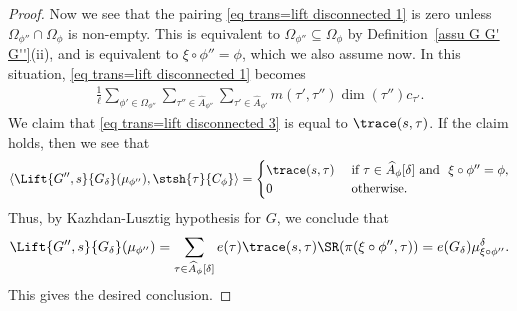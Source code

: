 \documentclass[11pt,letterpaper]{amsart}
\numberwithin{equation}{section}
\begin{document}
\begin{proof}
Now we see that the pairing \eqref{eq trans=lift disconnected 1} is zero unless $\Omega_{\phi''} \cap \Omega_{\phi}$ is non-empty. This is equivalent to $\Omega_{\phi''} \subseteq  \Omega_{\phi}$ by Definition~\ref{assu G G' G''}(ii), and is equivalent to $\xi \circ \phi''=\phi$, which we also assume now. In this situation, \eqref{eq trans=lift disconnected 1} becomes
   \begin{align}\label{eq trans=lift disconnected 3}
        \frac{1}{\ell} \sum_{\phi'\in \Omega_{\phi''}}  \sum_{\tau'' \in \widehat{A}_{\phi''}} \sum_{\tau' \in \widehat{A}_{\phi'}} m(\tau',\tau'') \dim(\tau'')  c_{\tau'}.
   \end{align}
   We claim that \eqref{eq trans=lift disconnected 3} is equal to $\trace(s,\tau)$. If the claim holds, then we see that 
   \[ \langle \Lift{G'',s}{G_{\delta}} (\mu_{\phi''}), \stsh{\tau}{C_{\phi}}\rangle= \begin{cases}
       \trace(s,\tau)  & \text{ if }\tau \in \widehat{A}_{\phi}[\delta] \text{ and }\ \xi \circ \phi''=\phi,\\
        0 &\text{ otherwise.}
   \end{cases}
\]
Thus, by Kazhdan-Lusztig hypothesis for $G$, we conclude that
   \[
   \Lift{G'',s}{G_{\delta}}
   (\mu_{\phi''}) = \sum_{\tau \in \widehat{A}_{\phi} [\delta]} e(\tau) \trace(s,\tau) \SR(\pi(\xi\circ \phi'', \tau))= e(G_{\delta}) \mu_{\xi \circ \phi''}^{\delta}. \]
This gives the desired conclusion.


\end{proof}
\end{document}
